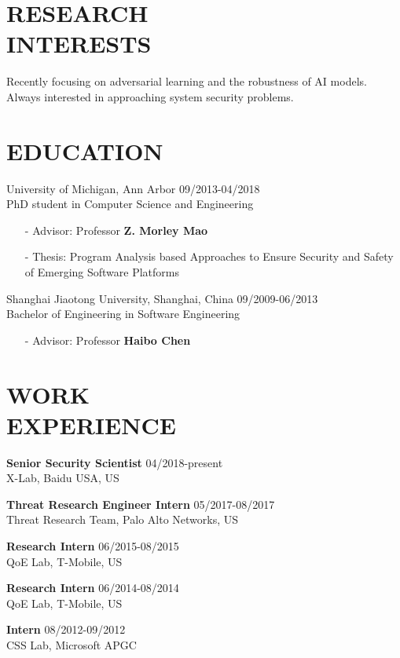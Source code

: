 \documentclass[margin]{res}
\begin{document}
\begin{resume}


\section{RESEARCH \\ INTERESTS}
Recently focusing on adversarial learning and the robustness of AI models. \\
Always interested in approaching system security problems. 

\section{EDUCATION} 
University of Michigan, Ann Arbor \hfill 09/2013-04/2018 \\
PhD student in Computer Science and Engineering
\begin{itemize}
\item[-] Advisor: Professor \textbf{Z. Morley Mao}
\item[-] Thesis: Program Analysis based Approaches to Ensure Security and Safety of Emerging Software Platforms
\end{itemize}

Shanghai Jiaotong University, Shanghai, China \hfill 09/2009-06/2013 \\
Bachelor of Engineering in Software Engineering
\begin{itemize}
\item[-] Advisor: Professor \textbf{Haibo Chen}
\end{itemize}

\section{WORK\\ EXPERIENCE}
\textbf{Senior Security Scientist} \hfill 04/2018-present\\
X-Lab, Baidu USA, US

\textbf{Threat Research Engineer Intern} \hfill 05/2017-08/2017 \\
Threat Research Team, Palo Alto Networks, US

\textbf{Research Intern} \hfill 06/2015-08/2015 \\
QoE Lab, T-Mobile, US

\textbf{Research Intern} \hfill 06/2014-08/2014 \\
QoE Lab, T-Mobile, US

\textbf{Intern} \hfill 08/2012-09/2012 \\
CSS Lab, Microsoft APGC



\end{resume}
\end{document}
